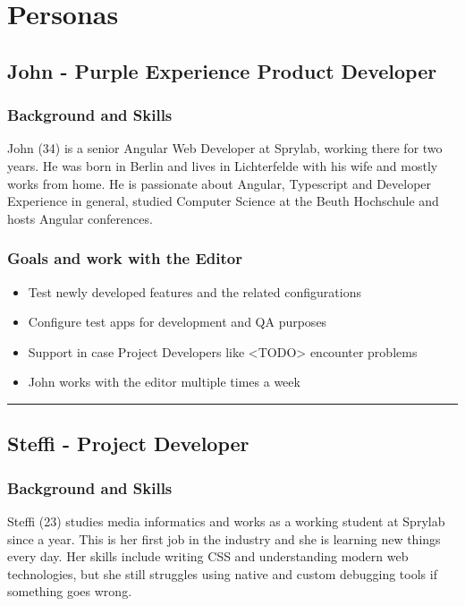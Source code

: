 
\chapter{Personas}
\label{app:personas}


\section{John - Purple Experience Product Developer}
\label{subsec:persona:productdev}
\subsection{Background and Skills}
John (34) is a senior Angular Web Developer at Sprylab, working there for two years. He was born in Berlin and lives in Lichterfelde with his wife and mostly works from home. He is passionate about Angular, Typescript and Developer Experience in general, studied Computer Science at the Beuth Hochschule and hosts Angular conferences.
\\
\subsection{Goals and work with the Editor}
\begin{itemize}
  \item Test newly developed features and the related configurations
  \item Configure test apps for development and QA purposes
  \item Support in case Project Developers like <TODO> encounter problems
  \item John works with the editor multiple times a week
\end{itemize}

\hrule
\section{Steffi - Project Developer}
\label{subsec:persona:projectdev}
\subsection{Background and Skills}
Steffi (23) studies media informatics and works as a working student at Sprylab since a year. This is her first job in the industry and she is learning new things every day. Her skills include writing CSS and understanding modern web technologies, but she still struggles using native and custom debugging tools if something goes wrong.  
\\
